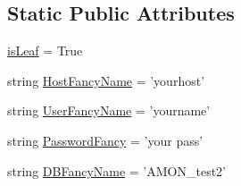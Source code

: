 \subsection*{Static Public Attributes}
\begin{DoxyCompactItemize}
\item 
\hyperlink{classamon__server__post__events_1_1_event_page_a2867e0aa66087e101805e8598c4a6fbc}{is\-Leaf} = True
\item 
string \hyperlink{classamon__server__post__events_1_1_event_page_a850cdc5e03e4e9592dc0fd36399884cd}{Host\-Fancy\-Name} = 'yourhost'
\item 
string \hyperlink{classamon__server__post__events_1_1_event_page_adbabe10502f40f6fb8562017ca3b332a}{User\-Fancy\-Name} = 'yourname'
\item 
string \hyperlink{classamon__server__post__events_1_1_event_page_a6cedf6892b5526dd3d44c0d859ff1d05}{Password\-Fancy} = 'your pass'
\item 
string \hyperlink{classamon__server__post__events_1_1_event_page_a7a316b87f2895a0565d00fe976c6ec24}{D\-B\-Fancy\-Name} = 'A\-M\-O\-N\-\_\-test2'
\end{DoxyCompactItemize}


